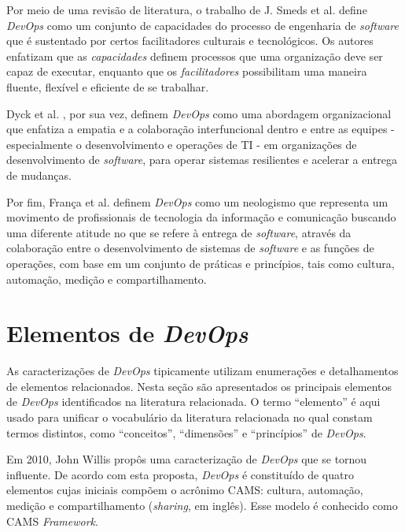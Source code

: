 Por meio de uma revisão de literatura, o trabalho de J. Smeds et al.
\cite{devops_a_definition} define \textit{DevOps} como um conjunto de
capacidades do processo de engenharia de \textit{software} que é sustentado
por certos facilitadores culturais e tecnológicos. Os autores enfatizam
que as \emph{capacidades} definem processos que uma organização deve ser capaz
de executar, enquanto que os \emph{facilitadores} possibilitam uma maneira
fluente, flexível e eficiente de se trabalhar.

Dyck et al. \cite{towards_definitions}, por sua vez, definem \textit{DevOps}
como uma abordagem organizacional que enfatiza a empatia e a colaboração
interfuncional dentro e entre as equipes - especialmente o desenvolvimento e
operações de TI - em organizações de desenvolvimento de \textit{software}, para
operar sistemas resilientes e acelerar a entrega de mudanças.

Por fim, França et al. \cite{characterizing_devops} definem \textit{DevOps}
como um neologismo que representa um movimento de profissionais de tecnologia
da informação e comunicação buscando uma diferente atitude no que se refere à
entrega de \textit{software}, através da colaboração entre o desenvolvimento de
sistemas de \textit{software} e as funções de operações, com base em um conjunto
de práticas e princípios, tais como cultura, automação, medição e compartilhamento.

\section{Elementos de \textit{DevOps}}\label{secao_elementos_devops}

As caracterizações de \textit{DevOps} tipicamente utilizam enumerações e
detalhamentos de elementos relacionados. Nesta seção são apresentados os
principais elementos de \textit{DevOps} identificados na literatura relacionada.
O termo ``elemento'' é aqui usado para unificar o vocabulário da literatura
relacionada no qual constam termos distintos, como ``conceitos'', ``dimensões''
e ``princípios'' de \textit{DevOps}.

Em 2010, John Willis propôs uma caracterização de \textit{DevOps}
\cite{what_devops_means_2010} que se tornou influente. De acordo com esta
proposta, \textit{DevOps} é constituído de quatro elementos cujas iniciais
compõem o acrônimo \acrshort{CAMS}: cultura, automação, medição e compartilhamento
(\textit{sharing}, em inglês). Esse modelo é conhecido como \acrshort{CAMS}
\textit{Framework}.

